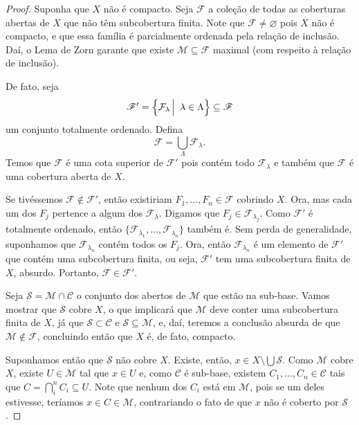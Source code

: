  \begin{proof}
 Suponha que 
 $X$
 não é compacto.
 Seja
 $\mathscr{F}$
 a coleção de todas as coberturas abertas de
 $X$
 que não têm subcobertura finita.
 Note que
 $\mathscr{F} \neq \varnothing$
 pois
 $X$
 não é compacto,
 e que essa família é parcialmente ordenada
 pela relação de inclusão.
 Daí, o Lema de Zorn garante que existe
 $\mathcal{M} \subseteq \mathscr{F}$
 maximal (com respeito à relação de inclusão).
 
 De fato, seja
 \begin{equation*}
     \mathscr{F}'
     =
     \setsuchthat{
     \mathcal{F}_{\lambda}
     }
     {
     \lambda \in \Lambda
     } \subseteq \mathscr{F}
 \end{equation*}
 um conjunto totalmente ordenado. Defina
 \begin{equation*}
     \mathcal{F} 
     = 
     \bigcup_{\Lambda} \mathcal{F}_{\lambda}.
 \end{equation*}
 Temos que 
 $\mathcal{F}$
 é uma cota superior de 
 $\mathscr{F}'$
 pois contém todo
 $\mathcal{F}_{\lambda}$
 e também que
 $\mathcal{F}$
 é uma cobertura aberta de
 $X$.
 
 Se tivéssemos
 $\mathcal{F} \notin \mathscr{F}'$,
 então existiriam 
 $F_1, \dots, F_n \in \mathcal{F}$
 cobrindo 
 $X$.
 Ora, mas cada um dos
 $F_j$ 
 pertence a algum dos
 $\mathcal{F}_{\lambda}$.
 Digamos que
 $F_j \in \mathcal{F}_{\lambda_j}$.
 Como
 $\mathscr{F}'$
 é totalmente ordenado,
 então
 $\{ \mathcal{F}_{\lambda_1}, \dots, \mathcal{F}_{\lambda_n} \}$
 também é.
 Sem perda de generalidade, suponhamos que
 $\mathcal{F}_{\lambda_n}$
 contém todos os
 $F_j$.
 Ora, então
 $\mathcal{F}_{\lambda_n}$
 é um elemento de
 $\mathscr{F}'$
 que contém uma subcobertura finita, ou seja,
 $\mathscr{F}'$
 tem uma subcobertura finita de 
 $X$, 
 absurdo.
 Portanto, 
 $\mathcal{F} \in \mathscr{F}'$.
 
 Seja 
 $\mathcal{S} = \mathcal{M} \cap \mathcal{C}$
 o conjunto dos abertos de
 $\mathcal{M}$
 que estão na sub-base.
 Vamos mostrar que
 $\mathcal{S}$
 cobre
 $X$,
 o que implicará que
 $\mathcal{M}$
 deve conter uma subcobertura finita de
 $X$,
 já que
 $\mathcal{S} \subset \mathcal{C}$
 e
 $\mathcal{S} \subseteq \mathcal{M}$,
 e, daí, teremos a conclusão absurda de que
 $\mathcal{M} \notin \mathscr{F}$,
 concluindo então que 
 $X$
 é, de fato, compacto.
 
 Suponhamos então que
 $\mathcal{S}$
 não cobre 
 $X$.
 Existe, então,
 $x \in X \setminus \bigcup \mathcal{S}$.
 Como
 $\mathcal{M}$
 cobre
 $X$, 
 existe
 $U \in \mathcal{M}$
 tal que
 $x\in U$
 e, como
 $\mathcal{C}$
 é sub-base, existem
 $C_1, \dots, C_n \in \mathcal{C}$
 tais que
 $C = \displaystyle{\bigcap_{i}^n C_i } \subseteq U$.
 Note que nenhum dos
 $C_i$
 está em
 $\mathcal{M}$,
 pois se um deles estivesse, teríamos
 $x\in C \in \mathcal{M}$,
 contrariando o fato de que 
 $x$
 não é coberto por 
 $\mathcal{S}$.
 

\end{proof}
